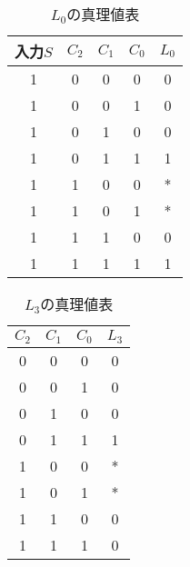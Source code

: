 \begin{table}[h]
\caption{$L_0$の真理値表}
\label{tab:q7_l0}
\centering
\begin{tabular}{ccccc}
\hline
入力$S$&$C_2$&$C_1$&$C_0$&$L_0$\\
\hline \hline
1 & 0 & 0 & 0 & 0 \\
1 & 0 & 0 & 1 & 0 \\
1 & 0 & 1 & 0 & 0 \\
1 & 0 & 1 & 1 & 1 \\
1 & 1 & 0 & 0 & * \\
1 & 1 & 0 & 1 & * \\
1 & 1 & 1 & 0 & 0 \\
1 & 1 & 1 & 1 & 1 \\
\hline
\end{tabular}
\end{table}
\begin{table}[h]
\caption{$L_3$の真理値表}
\label{tab:q7_l3}
\centering
\begin{tabular}{cccc}
\hline
$C_2$&$C_1$&$C_0$&$L_3$\\
\hline \hline
0 & 0 & 0 & 0 \\
0 & 0 & 1 & 0 \\
0 & 1 & 0 & 0 \\
0 & 1 & 1 & 1 \\
1 & 0 & 0 & * \\
1 & 0 & 1 & * \\
1 & 1 & 0 & 0 \\
1 & 1 & 1 & 0 \\
\hline
\end{tabular}
\end{table}